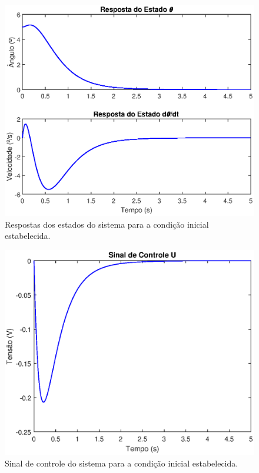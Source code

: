 \begin{figure}[H]
    \centering
    \includegraphics[scale=0.75]{ProjControladores/lqg_estados.eps}
    \caption{Respostas dos estados do sistema para a condição inicial estabelecida.}
    \label{fig:RespostaEstados-LQG}
\end{figure}{}

\begin{figure}[H]
    \centering
    \includegraphics[scale=0.75]{ProjControladores/lqg_sinal_controle.eps}
    \caption{Sinal de controle do sistema para a condição inicial estabelecida.}
    \label{fig:SinalControle-LQG}
\end{figure}{}


